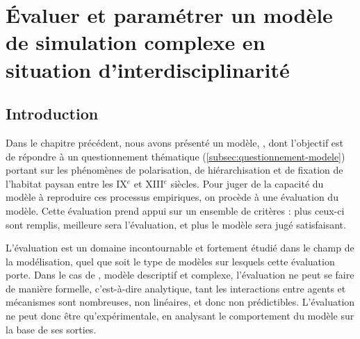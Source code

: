 \setcounter{chapter}{2}
\graphicspath{{chap3/}}


\chapter{Évaluer et paramétrer un modèle de simulation complexe en situation d'interdisciplinarité}
\label{chap:chap3}
%
\setcounter{minitocdepth}{2}
\vfill
{}
\minitoc
{}
\clearpage
{}

\section*{Introduction}
\label{sec:chap3-intro}

Dans le chapitre précédent, nous avons présenté un modèle, \simfeodal{}, dont l'objectif est de répondre à un questionnement thématique (\cref{subsec:questionnement-modele}) portant sur les phénomènes de polarisation, de hiérarchisation et de fixation de l'habitat paysan entre les IX$^e$ et XIII$^e$ siècles.
Pour juger de la capacité du modèle à reproduire ces processus empiriques, on procède à une \og évaluation\fg{} du modèle.
Cette évaluation prend appui sur un ensemble de critères : plus ceux-ci sont remplis, meilleure sera l'évaluation, et plus le modèle sera jugé satisfaisant.

L'évaluation est un domaine incontournable et fortement étudié dans le champ de la modélisation, quel que soit le type de modèles sur lesquels cette évaluation porte.
Dans le cas de \simfeodal{}, modèle descriptif et complexe, l'évaluation ne peut se faire de manière formelle, c'est-à-dire analytique, tant les interactions entre agents et mécanismes sont nombreuses, non linéaires, et donc non prédictibles.
L'évaluation ne peut donc être qu'expérimentale, en analysant le comportement du modèle sur la base de ses sorties.

